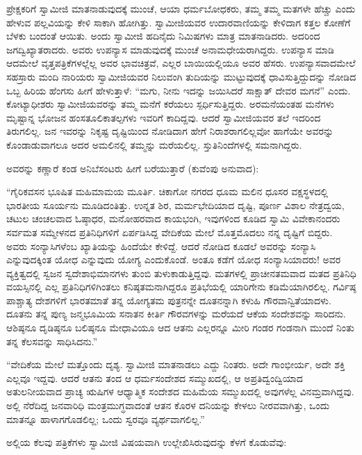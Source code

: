 ಪ್ರೇಕ್ಷಕರಿಗೆ ಸ್ವಾಮೀಜಿ ಮಾತನಾಡುವುದಕ್ಕೆ ಮುಂಚೆ, ಆಯಾ ಧರ್ಮಬೋಧಕರು, ತಮ್ಮ ತಮ್ಮ ಮತಗಳೇ ಹೆಚ್ಚು ಎಂದು ಹೇಳುವ ಪಲ್ಲವಿಯನ್ನು ಕೇಳಿ ಸಾಕಾಗಿ ಹೋಗಿತ್ತು. ಸ್ವಾಮೀಜಿಯವರ ಉದಾರವಾಣಿಯನ್ನು ಕೇಳಿದಾಗ ಕತ್ತಲ ಕೋಣೆಗೆ ಬೆಳಕು ಬಂದಂತೆ ಆಯಿತು. ಅಂದು ಸ್ವಾಮೀಜಿ ಹದಿನೈದು ನಿಮಿಷಗಳು ಮಾತ್ರ ಮಾತನಾಡಿದರು. ಅದರಿಂದ ಜಗದ್ವಿಖ್ಯಾತರಾದರು. ಅವರು ಉಪನ್ಯಾಸ ಮಾಡುವುದಕ್ಕೆ ಮುಂಚೆ ಅನಾಮಧೇಯರಾಗಿದ್ದರು. ಉಪನ್ಯಾಸ ಮಾಡಿ ಆದಮೇಲೆ ವೃತ್ತಪತ್ರಿಕೆಗಳಲ್ಲೆಲ್ಲ ಅವರ ಭಾವಚಿತ್ರವೆ, ಎಲ್ಲರ ಬಾಯಿಯಲ್ಲಿಯೂ ಅವರ ಹೆಸರು. ಉಪನ್ಯಾಸವಾದಮೇಲೆ ಸಹಸ್ರಾರು ಮಂದಿ ನಾರಿಯರು ಸ್ವಾಮೀಜಿಯವರ ನಿಲುವಂಗಿ ತುದಿಯನ್ನು ಮುಟ್ಟುವುದಕ್ಕೆ ಧಾವಿಸುತ್ತಿದ್ದುದನ್ನು ನೋಡಿದ ಒಬ್ಬ ಹಿರಿಯ ಹೆಂಗಸು ಹೀಗೆ ಹೇಳುತ್ತಾಳೆ: “ಮಗು, ನೀನು ಇದನ್ನು ಜಯಿಸಿದರೆ ಸಾಕ್ಷಾತ್ ದೇವರ ಮಗನೆ” ಎಂದು. ಕೋಟ್ಯಾಧೀಶರು ಸ್ವಾಮೀಜಿಯವರನ್ನು ತಮ್ಮ ಮನೆಗೆ ಕರೆಯಲು ಸ್ಪರ್ಧಿಸುತ್ತಿದ್ದರು. ಅರಮನೆಯಂತಹ ಮನೆಗಳು ಮೃಷ್ಟಾನ್ನ ಭೋಜನ ಹಂಸತೂಲಿಕಾತಲ್ಪಗಳು ಇವರಿಗೆ ಕಾದಿದ್ದವು. ಆದರೆ ಸ್ವಾಮೀಜಿಯವರ ತಲೆ ಇದರಿಂದ ತಿರುಗಲಿಲ್ಲ. ಜನ ಇವರನ್ನು ನಿಕೃಷ್ಟ ದೃಷ್ಟಿಯಿಂದ ನೋಡಿದಾಗ ಹೇಗೆ ನಿರಾಶರಾಗಲಿಲ್ಲವೋ ಹಾಗೆಯೇ ಅವರನ್ನು ಕೊಂಡಾಡುವಾಗಲೂ ಅದರ ಅಮಲಿನಲ್ಲಿ ತಮ್ಮನ್ನು ಮರೆಯಲಿಲ್ಲ. ಸ್ತುತಿನಿಂದೆಗಳಲ್ಲಿ ಸಮನಾಗಿದ್ದರು. 

 ಅವರನ್ನು ಕಣ್ಣಾರೆ ಕಂಡ ಅನಿಬೆಸಂಟರು ಹೀಗೆ ಬರೆಯುತ್ತಾರೆ (ಕುವೆಂಪು ಅನುವಾದ): 

 “ಗೈರಿಕವಸನ ಭೂಷಿತ ಮಹಿಮಾಮಯ ಮೂರ್ತಿ. ಚಿಕಾಗೋ ನಗರದ ಧೂಮ ಮಲಿನ ಧೂಸರ ವಕ್ಷಸ್ಥಳದಲ್ಲಿ ಭಾರತೀಯ ಸೂರ್ಯನು ಮೂಡಿದಂತಿತ್ತು. ಉನ್ನತ ಶಿರ, ಮರ್ಮಭೇದಿಯಾದ ದೃಷ್ಟಿ, ಪೂರ್ಣ ವಿಶಾಲ ನೇತ್ರದ್ವಯ, ಚಟುಲ ಚಂಚಲವಾದ ಓಷ್ಠಾಧರ, ಮನೋಹರವಾದ ಕಾಯಭಂಗಿ, ಇವುಗಳಿಂದ ಕೂಡಿದ ಸ್ವಾಮಿ ವಿವೇಕಾನಂದರು ಸರ್ವಮತ ಸಮ್ಮೇಳನದ ಪ್ರತಿನಿಧಿಗಳಿಗೆ ಏರ್ಪಡಿಸಿದ್ದ ವೇದಿಕೆಯ ಮೇಲೆ ಮೊತ್ತಮೊದಲು ನನ್ನ ದೃಷ್ಟಿಗೆ ಬಿದ್ದರು. ಅವರು ಸಂನ್ಯಾಸಿಗಳೆಂಬ ಖ್ಯಾತಿಯನ್ನು ಹಿಂದೆಯೇ ಕೇಳಿದ್ದೆ. ಆದರೆ ನೋಡಿದ ಕೂಡಲೆ ಅವರನ್ನು ಸಂನ್ಯಾಸಿ ಎನ್ನುವುದಕ್ಕಿಂತ ಯೋಧ ಎನ್ನುವುದು ಯೋಗ್ಯ ಎಂದುಕೊಂಡೆ. ಅಂತೂ ಕಡೆಗೆ ಯೋಧ ಸಂನ್ಯಾಸಿಯಾದರು! ಅವರ ವ್ಯಕ್ತಿತ್ವದಲ್ಲಿ ಸ್ವಜನ ಸ್ವದೇಶಾಭಿಮಾನಗಳು ತುಂಬಿ ತುಳುಕಾಡುತ್ತಿದ್ದವು. ಮತಗಳಲ್ಲಿ ಪ್ರಾಚೀನತಮವಾದ ಮತದ ಪ್ರತಿನಿಧಿ ವಯಸ್ಸಿನಲ್ಲಿ ಎಲ್ಲ ಪ್ರತಿನಿಧಿಗಳಿಗಿಂತಲು ಕನಿಷ್ಠತಮನಾಗಿದ್ದರೂ ಪ್ರತಿಭೆಯಲ್ಲಿ ಯಾರಿಗೇನು ಕಡಿಮೆಯಾಗಿರಲಿಲ್ಲ. ಗರ್ವಿಷ್ಠ ಪಾಶ್ಚಾತ್ಯ ದೇಶಗಳಿಗೆ ಭಾರತಮಾತೆ ತನ್ನ ಯೋಗ್ಯತಮ ಪುತ್ರನನ್ನೇ ದೂತನನ್ನಾಗಿ ಕಳುಹಿ ಗೌರವಾನ್ವಿತೆಯಾದಳು. ದೂತನು ತನ್ನ ಪುಣ್ಯ ಜನ್ಮಭೂಮಿಯ ಸನಾತನ ಕೀರ್ತಿ ಗೌರವಗಳನ್ನು ಮರೆಯದೆ ಆಕೆಯ ಸಂದೇಶವನ್ನು ಸಾರಿದನು. ಆಶಿಷ್ಠನೂ ದೃಡಿಷ್ಠನೂ ಬಲಿಷ್ಠನೂ ಮೇಧಾವಿಯೂ ಆದ ಆತನು ಎಲ್ಲರನ್ನೂ ಮೀರಿ ಗಂಡರ ಗಂಡನಾಗಿ ಮುಂದೆ ನಿಂತು ತನ್ನ ಕೆಲಸವನ್ನು ಸಾಧಿಸಿದನು.” 

“ವೇದಿಕೆಯ ಮೇಲೆ ಮತ್ತೊಂದು ದೃಶ್ಯ. ಸ್ವಾಮೀಜಿ ಮಾತನಾಡಲು ಎದ್ದು ನಿಂತರು. ಅದೇ ಗಾಂಭೀರ್ಯ, ಅದೇ ಶಕ್ತಿ ಎಲ್ಲವೂ ಇದ್ದವು. ಆದರೆ ಆತನು ತಂದ ಆ ಧರ್ಮಸಂದೇಶದ ಸಮ್ಮುಖದಲ್ಲಿ, ಆ ಅಪ್ರತಿದ್ವಂದ್ವಿಯಾದ ಅತುಲನೀಯವಾದ ಪ್ರಾಚ್ಯ ಋಷಿಗಳ ಆಧ್ಯಾತ್ಮಿಕ ಸಂದೇಶದ ಮಹಿಮೆಯ ಸಮ್ಮುಖದಲ್ಲಿ ಅವುಗಳೆಲ್ಲ ವಿನಮ್ರವಾಗಿದ್ದವು. ಅಲ್ಲಿ ನೆರೆದಿದ್ದ ಜನವಾರಿಧಿ ಮಂತ್ರಮುಗ್ಧವಾದಂತೆ ಆತನ ಕೊರಳ ದನಿಯನ್ನು ಕೇಳಲು ನೀರವವಾಗಿತ್ತು, ಒಂದು ಮಾತನ್ನೂ ಹಾಳಾಗಗೊಡಲಿಲ್ಲ; ಒಂದು ಸ್ವರವೂ ವ್ಯರ್ಥವಾಗಲಿಲ್ಲ.” 

 ಅಲ್ಲಿಯ ಕೆಲವು ಪತ್ರಿಕೆಗಳು ಸ್ವಾಮೀಜಿ ವಿಷಯವಾಗಿ ಉಲ್ಲೇಖಿಸಿರುವುದನ್ನು ಕೆಳಗೆ ಕೊಡುವೆವು: 

